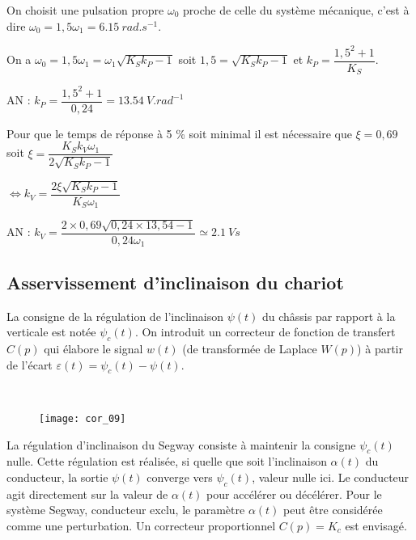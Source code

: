 On choisit une pulsation propre $\omega_0$  proche de celle du système mécanique, c’est à dire  
$\omega_0=1,5 \omega_1 = \SI{6,15}{rad.s^{-1}}$.

\ifprof
\begin{corrige}
On a $\omega_0=1,5 \omega_1 =  \omega_1\sqrt{K_Sk_P-1}$ soit $1,5  = \sqrt{K_Sk_P-1}$ et $ k_P = \dfrac{1,5^2 +1}{K_S}$.

AN : $ k_P = \dfrac{1,5^2 +1}{0,24} = \SI{13,54}{V.rad^{-1}}$

Pour que le temps de réponse à 5 \% soit minimal il est nécessaire que $\xi=0,69$ soit $\xi=\dfrac{K_Sk_V \omega_1}{2\sqrt{K_Sk_P-1}}$

$\Leftrightarrow k_V = \dfrac{2\xi \sqrt{K_Sk_P-1}}{K_S \omega_1}  $

AN : $ k_V = \dfrac{2\times  0,69 \sqrt{0,24 \times 13,54-1}}{0,24 \omega_1} \simeq  \SI{2,1}{Vs}$

\end{corrige}
\else
\fi

\subsection{Asservissement d’inclinaison du chariot}

\ifprof
\else
La consigne de la régulation de l’inclinaison $\psi(t)$ du châssis par rapport à la verticale est notée $\psi_c(t)$. On introduit un correcteur de fonction de transfert $C(p)$ qui élabore le signal $w(t)$ (de transformée de Laplace $W(p)$) à partir de l’écart $\varepsilon(t)=\psi_c(t)-\psi(t)$.
\fi

\ifprof
\begin{corrige}~\\

\begin{figure}[H]
\centering
\texttt{[image: cor\_09]}
\end{figure}


\end{corrige}
\else
\fi

\ifprof
\else
La régulation d’inclinaison du Segway consiste à maintenir la consigne $\psi_c(t)$ nulle. Cette régulation est réalisée, si quelle que soit l’inclinaison $\alpha(t)$ du conducteur, la sortie $\psi(t)$ converge vers $\psi_c(t)$, valeur nulle ici.
Le conducteur agit directement sur la valeur de $\alpha(t)$ pour accélérer ou décélérer. Pour le système Segway, conducteur exclu, le paramètre $\alpha(t)$ peut être considérée comme une perturbation.
Un correcteur proportionnel $C(p)=K_c$ est envisagé.

